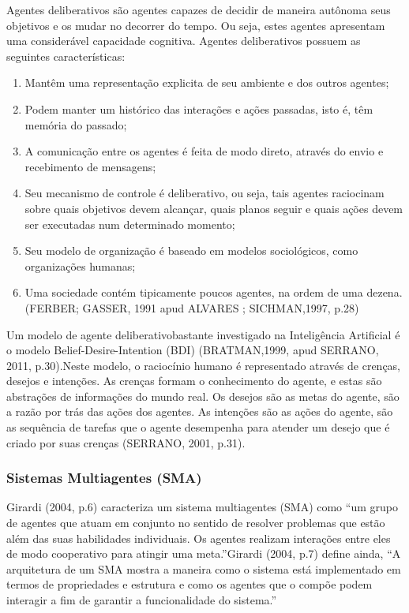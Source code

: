 Agentes deliberativos são agentes capazes de decidir de maneira autônoma seus objetivos e os mudar no decorrer do tempo. Ou seja, estes agentes apresentam uma considerável capacidade cognitiva. Agentes deliberativos possuem as seguintes características:
\begin{citacao}
\begin{enumerate}

	\item Mantêm uma representação explicita de seu ambiente e dos outros agentes;
	\item Podem manter um histórico das interações e ações passadas, isto é, têm memória do passado;
	\item A comunicação entre os agentes é feita de modo direto, através do envio e recebimento de mensagens;
	\item Seu mecanismo de controle é deliberativo, ou seja, tais agentes raciocinam sobre quais objetivos devem alcançar, quais planos seguir e quais ações devem ser executadas num determinado momento;
	\item Seu modelo de organização é baseado em modelos sociológicos, como organizações humanas;
	\item Uma sociedade contém tipicamente poucos agentes, na ordem de uma dezena.
	(FERBER; GASSER, 1991 apud ALVARES ; SICHMAN,1997, p.28)

\end{enumerate}
\end{citacao}

Um modelo de agente deliberativobastante investigado na Inteligência Artificial é o modelo Belief-Desire-Intention (BDI) (BRATMAN,1999, apud SERRANO, 2011, p.30).Neste modelo, o raciocínio humano é representado através de crenças, desejos e intenções. As crenças formam o conhecimento do agente, e estas são abstrações de informações do mundo real. Os desejos são as metas do agente, são a razão por trás das ações dos agentes. As intenções são as ações do agente, são as sequência de tarefas que o agente desempenha para atender um desejo que é criado por suas crenças (SERRANO, 2001, p.31).


\subsubsection{Sistemas Multiagentes (SMA)}

Girardi (2004, p.6) caracteriza um sistema multiagentes (SMA) como “um grupo de agentes que atuam em conjunto no sentido de resolver problemas que estão além das suas habilidades individuais. Os agentes realizam interações entre eles de modo cooperativo para atingir uma meta.”Girardi (2004, p.7) define ainda, “A arquitetura  de um SMA mostra a maneira como o sistema está implementado em termos de propriedades e estrutura e como os agentes que o compõe podem interagir a fim de garantir a funcionalidade do sistema.”

